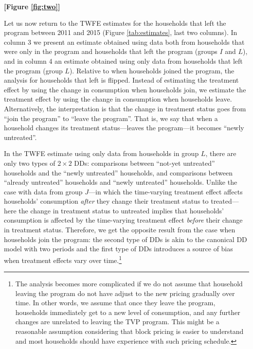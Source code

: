 \documentclass[12pt]{article}
\begin{document}
\centerline{\textbf{[Figure \ref{fig:two}]}}


Let us now return to the TWFE estimates for the households that left the program between 2011 and 2015 (Figure \ref{tab:estimates}, last two columns). In column 3 we present an estimate obtained using data both from households that were only in the program and households that left the program (groups $I$ and  $L$), and in column 4 an estimate obtained using only data from households that left the program (group $L$). Relative to when households joined the program, the analysis for households that left is flipped. Instead of estimating the treatment effect by using the change in consumption when households join, we estimate the treatment effect by using the change in consumption when households leave. Alternatively, the interpretation is that the change in treatment status goes from \enquote{join the program} to \enquote{leave the program}. That is, we say that when a household changes its treatment status---leaves the program---it becomes \enquote{newly untreated}.

In the TWFE estimate using only data from households in group $L$, there are only two types of $2 \times 2$  DDs: comparisons between \enquote{not-yet untreated} households and the \enquote{newly untreated} households, and comparisons between \enquote{already untreated} households and \enquote{newly untreated} households. Unlike the case with data from group $J$---in which the time-varying treatment effect affects households’ consumption \emph{after} they change their treatment status to treated---here the change in treatment status to untreated implies that households’ consumption is affected by the time-varying treatment effect \emph{before} their change in treatment status. Therefore, we get the opposite result from the case when households join the program: the second type of DDs is akin to the canonical DD model with two periods and the first type of DDs introduces a source of bias when treatment effects vary over time.\footnote{The analysis becomes more complicated if we do not assume that household leaving the program do not have adjust to the new pricing gradually over time. In other words, we assume that once they leave the program, households immediately get to a new level of consumption, and any further changes are unrelated to leaving the TVP program. This might be a reasonable assumption considering that block pricing is easier to understand and most households should have experience with such pricing schedule.}
\end{document}

